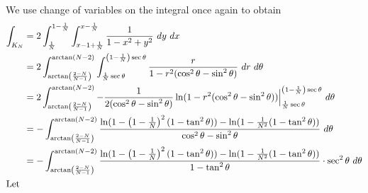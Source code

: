 \documentclass{../../../tex-setup/eh-homework}
\begin{document}
\begin{question}{38}
\[    \]
    We use change of variables on the integral once again to obtain
    \begin{align*}
        \int _{K_N} &= 2\int _{\frac{1}{N}}^{1-\frac{1}{N}} \int _{x - 1 + \frac{1}{N}}^{x-\frac{1}{N}} \frac{1}{1 - x^2 + y^2}\ dy\ dx \\
        &= 2 \int _{\arctan \left( \frac{2-N}{N-1} \right)}^{\arctan (N-2)} \int _{\frac{1}{N}\sec \theta}^{\left( 1-\frac{1}{N} \right)\sec \theta} \frac{r}{1 - r^2(\cos ^2 \theta - \sin ^2 \theta)}\ dr\ d \theta \\
        &= 2 \int _{\arctan \left( \frac{2-N}{N-1} \right)}^{\arctan (N-2)} -\frac{1}{2(\cos ^2 \theta - \sin ^2 \theta)}\ln (1 - r^2(\cos ^2 \theta - \sin ^2 \theta)) \Big| _{\frac{1}{N}\sec \theta}^{\left( 1 - \frac{1}{N} \right)\sec \theta}\ d \theta \\
        &= -\int _{\arctan \left( \frac{2-N}{N-1} \right)}^{\arctan (N-2)} \frac{\ln (1 - \left( 1 - \frac{1}{N} \right)^2(1 - \tan ^2 \theta)) - \ln (1 - \frac{1}{N^2}(1 - \tan ^2 \theta))}{\cos ^2 \theta - \sin ^2 \theta}\ d \theta \\
        &= -\int _{\arctan \left( \frac{2-N}{N-1} \right)}^{\arctan (N-2)} \frac{\ln (1 - \left( 1 - \frac{1}{N} \right)^2(1 - \tan ^2 \theta)) - \ln (1 - \frac{1}{N^2}(1 - \tan ^2 \theta))}{1 - \tan ^2 \theta}\cdot \sec ^2 \theta\ d \theta \\
        \intertext{Let }
    \end{align*}
    \end{question}
\end{document}
